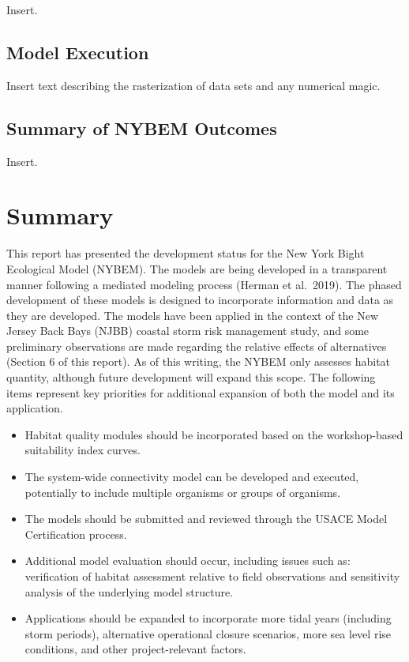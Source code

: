 \documentclass[
]{book}
\begin{document}
Insert.

\hypertarget{model-execution}{%
\section{Model Execution}\label{model-execution}}

Insert text describing the rasterization of data sets and any numerical magic.

\hypertarget{summary-of-nybem-outcomes}{%
\section{Summary of NYBEM Outcomes}\label{summary-of-nybem-outcomes}}

Insert.

\hypertarget{summary}{%
\chapter{Summary}\label{summary}}

This report has presented the development status for the New York Bight Ecological Model (NYBEM). The models are being developed in a transparent manner following a mediated modeling process (Herman et al.~2019). The phased development of these models is designed to incorporate information and data as they are developed. The models have been applied in the context of the New Jersey Back Bays (NJBB) coastal storm risk management study, and some preliminary observations are made regarding the relative effects of alternatives (Section 6 of this report).
As of this writing, the NYBEM only assesses habitat quantity, although future development will expand this scope. The following items represent key priorities for additional expansion of both the model and its application.

\begin{itemize}
\item
  Habitat quality modules should be incorporated based on the workshop-based suitability index curves.
\item
  The system-wide connectivity model can be developed and executed, potentially to include multiple organisms or groups of organisms.
\item
  The models should be submitted and reviewed through the USACE Model Certification process.
\item
  Additional model evaluation should occur, including issues such as: verification of habitat assessment relative to field observations and sensitivity analysis of the underlying model structure.
\item
  Applications should be expanded to incorporate more tidal years (including storm periods), alternative operational closure scenarios, more sea level rise conditions, and other project-relevant factors.
\end{itemize}
\end{document}
